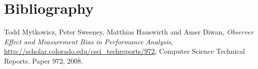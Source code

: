 \chapter{Bibliography}
\begin{thebibliography}{9}

  Todd Mytkowicz, Peter Sweeney, Matthias Hauswirth and Amer Diwan,
  \emph{Observer Effect and Measurement Bias in Performance Analysis},
  \url{http://scholar.colorado.edu/csci_techreports/972},
  Computer Science Technical Reports. Paper 972,
  2008.


\end{thebibliography}